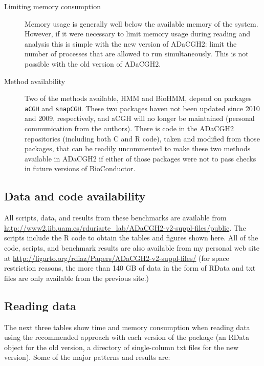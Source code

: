 \documentclass[a4paper,11pt]{article}
\begin{document}
\begin{description}
\item[Limiting memory consumption] Memory usage is generally well below
  the available memory of the system. However, if it were necessary to
  limit memory usage during reading and analysis this is simple with the
  new version of ADaCGH2: limit the number of processes that are allowed
  to run simultaneously. This is not possible with the old version of
  ADaCGH2.

\item[Method availability] Two of the methods available, HMM and BioHMM,
  depend on packages \texttt{aCGH} and \texttt{snapCGH}. These two
  packages haven not been updated since 2010 and 2009, respectively, and
  aCGH will no longer be maintained (personal communication from the
  authors). There is code in the ADaCGH2 repositories (including both C
  and R code), taken and modified from those packages, that can be readily
  uncommented to make these two methods available in ADaCGH2 if either of
  those packages were not to pass checks in future versions of
  BioConductor.
 
\end{description}



\subsection{Data and code availability}

All scripts, data, and results from these benchmarks are available from
\url{http://www2.iib.uam.es/rduriarte\_lab/ADaCGH2-v2-suppl-files/public}. The
scripts include the R code to obtain the tables and figures shown
here. All of the code, scripts, and benchmark results are also available
from my personal web site at
\url{http://ligarto.org/rdiaz/Papers/ADaCGH2-v2-suppl-files/} (for space
restriction reasons, the more than 140 GB of data in the form of RData and
txt files are only available from the previous site.)



\clearpage
\subsection{Reading data}\label{comp-read}

The next three tables show time and memory consumption when reading data
using the recommended approach with each version of the package (an RData
object for the old version, a directory of single-column txt files for the
new version). Some of the major patterns and results are:
\end{document}
